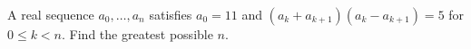 A real sequence $a_0,\ldots,a_n$ satisfies $a_0=11$ and $(a_k+a_{k+1})(a_k-a_{k+1})=5$ for $0\le k<n$. Find the greatest possible $n$.
